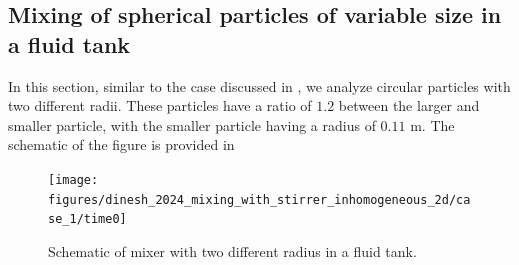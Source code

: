 \documentclass[preprint,12pt]{elsarticle}
\begin{document}
\FloatBarrier%
\subsection{Mixing of spherical particles of variable size in a fluid tank}
\label{sec:mixing-spherical-particles-in-fluid-tank-inhomogeneous}
In this section, similar to the case discussed in
, we analyze circular
particles with two different radii. These particles have a ratio of $1.2$
between the larger and smaller particle, with the smaller particle having a
radius of $0.11$ m. The schematic of the figure is provided in
\begin{figure}[!htpb]
  \centering
  \texttt{[image: figures/dinesh\_2024\_mixing\_with\_stirrer\_inhomogeneous\_2d/case\_1/time0]}
  \caption{Schematic of mixer with two different radius in a fluid
    tank.}\label{fig:schematic-Dinesh-mixer-inhomogeneous}
\end{figure}
\end{document}
